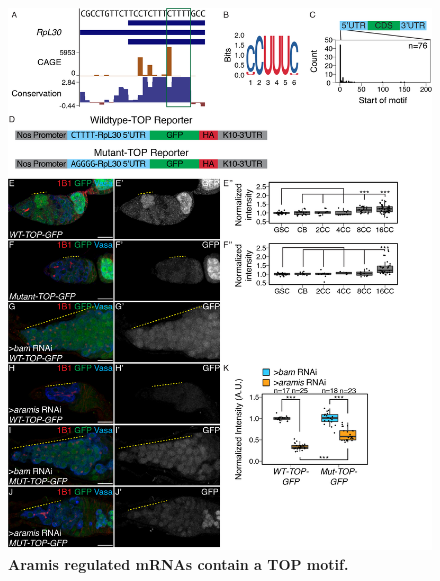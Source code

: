 \documentclass[12pt,oneside]{reedthesis}
\begin{document}
\begin{figure}

{\centering \includegraphics[width=6.5 in,height=8.9375 in]{./figure/Ribosome Biogenesis/Ribosome Biogenesis 6} 

}

\caption[\textbf{Aramis regulated mRNAs contain a TOP motif.}]{\textbf{Aramis regulated mRNAs contain a TOP motif.}}\label{fig:unnamed-chunk-11}
\end{figure}
\end{document}
